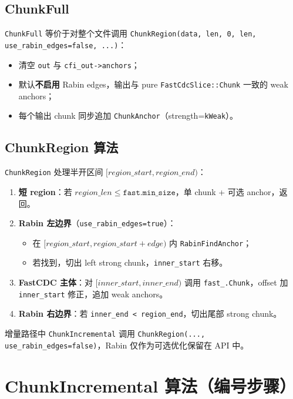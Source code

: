 \subsection{ChunkFull}

\texttt{ChunkFull} 等价于对整个文件调用 \texttt{ChunkRegion(data, len, 0, len, use\_rabin\_edges=false, ...)}：
\begin{itemize}[nosep]
  \item 清空 \texttt{out} 与 \texttt{cfi\_out->anchors}；
  \item 默认\textbf{不启用} Rabin edges，输出与 pure \texttt{FastCdcSlice::Chunk} 一致的 weak anchors；
  \item 每个输出 chunk 同步追加 \texttt{ChunkAnchor}（strength=\texttt{kWeak}）。
\end{itemize}

\subsection{ChunkRegion 算法}

\texttt{ChunkRegion} 处理半开区间 $[\mathit{region\_start}, \mathit{region\_end})$：

\begin{enumerate}
  \item \textbf{短 region}：若 $\mathit{region\_len} \leq \texttt{fast.min\_size}$，单 chunk + 可选 anchor，返回。
  \item \textbf{Rabin 左边界}（\texttt{use\_rabin\_edges=true}）：
  \begin{itemize}[nosep]
    \item 在 $[\mathit{region\_start}, \mathit{region\_start}+\mathit{edge})$ 内 \texttt{RabinFindAnchor}；
    \item 若找到，切出 left strong chunk，\texttt{inner\_start} 右移。
  \end{itemize}
  \item \textbf{FastCDC 主体}：对 $[\mathit{inner\_start}, \mathit{inner\_end})$ 调用 \texttt{fast\_.Chunk}，offset 加 \texttt{inner\_start} 修正，追加 weak anchors。
  \item \textbf{Rabin 右边界}：若 \texttt{inner\_end < region\_end}，切出尾部 strong chunk。
\end{enumerate}

增量路径中 \texttt{ChunkIncremental} 调用 \texttt{ChunkRegion(..., use\_rabin\_edges=false)}，Rabin 仅作为可选优化保留在 API 中。

\section{ChunkIncremental 算法（编号步骤）}
\label{sec:hcrbo-incremental}


